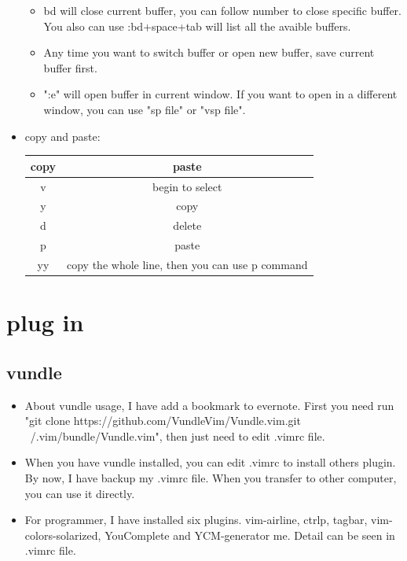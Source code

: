 \documentclass[a4paper,12pt,twoside]{book}
\begin{document}
\begin{itemize}
\begin{itemize}
			\item bd will close current buffer, you can follow number to close specific buffer. You also can use :bd+space+tab will list all the avaible buffers.
			\item Any time you want to switch buffer or open new buffer, save current buffer first.
			\item ":e" will open buffer in current window. If you want to open in a different window, you can use "sp file" or "vsp file".
	\end{itemize}

    
    \item copy and paste:
    
    \begin{center}
        \begin{tabular}{c|c}
		copy & paste\\
		\hline v & begin to select\\
		y & copy\\
		d & delete\\
		p & paste \\
		yy & copy the whole line, then you can use p command  \\
		
			\end{tabular}
	\end{center}
		
\end{itemize}

\section{plug in}
\subsection{vundle}
\begin{itemize}
		\item About vundle usage, I have add a bookmark to evernote. First you need run "git clone https://github.com/VundleVim/Vundle.vim.git ~/.vim/bundle/Vundle.vim", then just need to edit .vimrc file.  

\item When you have vundle installed, you can edit .vimrc to install others plugin. By now, I have backup my .vimrc file. When you transfer to other computer, you can use it directly. 

\item For programmer, I have installed six plugins.  vim-airline, ctrlp, tagbar,  vim-colors-solarized, YouComplete and YCM-generator me. Detail can be seen in .vimrc file.
		\end{itemize}
\end{document}
